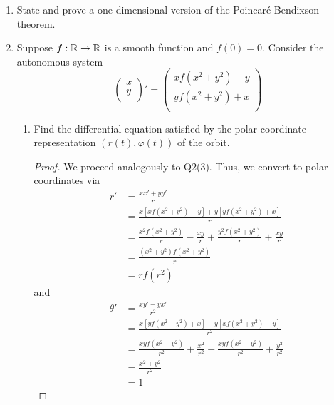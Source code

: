 \documentclass[../psets.tex]{subfiles}
\begin{document}
\begin{enumerate}
\begin{enumerate}
        \begin{proof}
            hi
        \end{proof}
    \end{enumerate}
    \item State and prove a one-dimensional version of the Poincar\'{e}-Bendixson theorem.
    \item Suppose $f:\mathbb{R}\to\mathbb{R}$ is a smooth function and $f(0)=0$. Consider the autonomous system
    \begin{equation*}
        \begin{pmatrix}
            x\\
            y\\
        \end{pmatrix}'
        =
        \begin{pmatrix}
            xf(x^2+y^2)-y\\
            yf(x^2+y^2)+x\\
        \end{pmatrix}
    \end{equation*}
    \begin{enumerate}
        \item Find the differential equation satisfied by the polar coordinate representation $(r(t),\varphi(t))$ of the orbit.
        \begin{proof}
            We proceed analogously to Q2(3). Thus, we convert to polar coordinates via
            \begin{align*}
                r' &= \frac{xx'+yy'}{r}\\
                &= \frac{x[xf(x^2+y^2)-y]+y[yf(x^2+y^2)+x]}{r}\\
                &= \frac{x^2f(x^2+y^2)}{r}-\frac{xy}{r}+\frac{y^2f(x^2+y^2)}{r}+\frac{xy}{r}\\
                &= \frac{(x^2+y^2)f(x^2+y^2)}{r}\\
                &= rf(r^2)
            \end{align*}
            and
            \begin{align*}
                \theta' &= \frac{xy'-yx'}{r^2}\\
                &= \frac{x[yf(x^2+y^2)+x]-y[xf(x^2+y^2)-y]}{r^2}\\
                &= \frac{xyf(x^2+y^2)}{r^2}+\frac{x^2}{r^2}-\frac{xyf(x^2+y^2)}{r^2}+\frac{y^2}{r^2}\\
                &= \frac{x^2+y^2}{r^2}\\
                &= 1
            \end{align*}

\end{proof}
\end{enumerate}
\end{enumerate}
\end{document}
